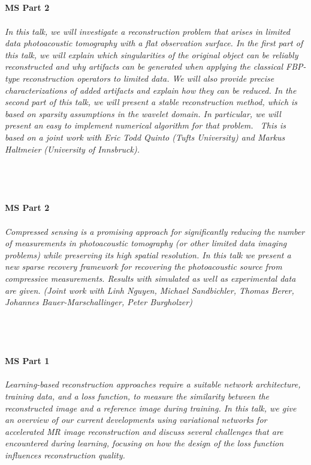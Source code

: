 \begin{multicols}{2}
\\ 
    \\
    \\\\
    \noindent\textbf{MS Part 2}\\
\\  
    \textit{In this talk, we will investigate a reconstruction problem that arises in limited data photoacoustic tomography with a flat observation surface. In the first part of this talk, we will explain which singularities of the original object can be reliably reconstructed and why artifacts can be generated when applying the classical FBP-type reconstruction operators to limited data. We will also provide precise characterizations of added artifacts and explain how they can be reduced. In the second part of this talk, we will present a stable reconstruction method, which is based on sparsity assumptions in the wavelet  domain. In particular, we will present an easy to implement numerical algorithm for that problem.
\
This is based on a joint work with Eric Todd Quinto (Tufts University) and Markus Haltmeier (University of Innsbruck).}\\
\\ 
    \\
    \\\\
    \noindent\textbf{MS Part 2}\\
\\  
    \textit{Compressed sensing is a promising approach for significantly reducing the number of measurements in photoacoustic tomography (or other limited data imaging problems) while preserving its high spatial resolution. In this talk we present a new sparse recovery framework for recovering the photoacoustic source from compressive measurements.  Results with simulated as well as experimental data are given. (Joint work with Linh Nguyen, Michael Sandbichler, Thomas Berer, Johannes Bauer-Marschallinger, Peter Burgholzer)}\\
\\ 
    \\
    \\\\
    \noindent\textbf{MS Part 1}\\
\\  
    \textit{Learning-based reconstruction approaches require a suitable network architecture, training data, and a loss function, to measure the similarity between the reconstructed image and a reference image during training. In this talk, we give an overview of our current developments using variational networks for accelerated MR image reconstruction and discuss several challenges that are encountered during learning, focusing on how the design of the loss function influences reconstruction quality.}\\

\end{multicols}
